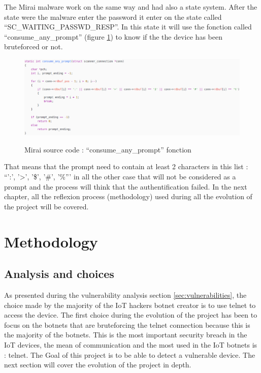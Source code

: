 \documentclass{report}
\begin{document}
The Mirai malware work on the same way and had also a state system. After the state were the malware enter the password it enter on the state called ``SC\_WAITING\_PASSWD\_RESP''. In this state it will use the fonction called ``consume\_any\_prompt'' (figure \ref{fig:mirai-prompt}) to know if the the device has been bruteforced or not.

\begin{figure}
  \caption{Mirai source code : ``consume\_any\_prompt'' fonction}
 \centering
 \includegraphics[width=1.2\textwidth]{./img/mirai-prompt}
 \label{fig:mirai-prompt}
\end{figure}
That means that the prompt need to contain at least 2 characters in this list : ``':', '>', '\$', '\#', '\%''' in all the other case that will not be considered as a prompt and the process will think that the authentification failed.\newline
In the next chapter, all the reflexion process (methodology) used during all the evolution of the project will be covered.
\chapter{Methodology}
\section{Analysis and choices}
As presented during the vulnerability analysis section \ref{sec:vulnerabilities}, the choice made by the majority of the IoT hackers botnet creator is to use telnet to access the device. \newline
The first choice during the evolution of the project has been to focus on the botnets that are bruteforcing the telnet connection because this is the majority of the botnets.
This is the most important security breach in the IoT devices, the mean of communication and the most used in the IoT botnets is : telnet. The Goal of this project is to be able to detect a vulnerable device.\newline
The next section will cover the evolution of the project in depth.
\end{document}
